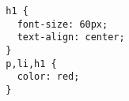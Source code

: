 \documentclass{article}
\begin{document}
\begin{verbatim}
  h1 {
    font-size: 60px;
    text-align: center;
  }
  p,li,h1 {
    color: red;
  }
\end{verbatim}
\end{document}
